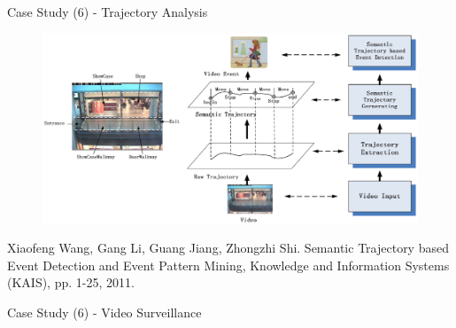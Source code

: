 \documentclass[
 size=14pt,
 paper=smartboard,  %
 mode=present, 		%
 display=slides, 	%
 pauseslide,
 fleqn,leqno]{powerdot}{}
\begin{document}
\begin{slide}{Case Study (6) - Trajectory Analysis}
\begin{figure}[htbp]
  \includegraphics[width=1.0\textwidth]{figures//theme1//dsa_3.eps}
\end{figure}
\footnotesize{Xiaofeng Wang, Gang Li, Guang Jiang, Zhongzhi Shi.
Semantic Trajectory based Event Detection and Event Pattern Mining,
Knowledge and Information Systems (KAIS), pp. 1-25, 2011.}
\end{slide}


\begin{slide}[toc=,bm=]{Case Study (6) - Video Surveillance}
\begin{figure}[ht]
\end{figure}

\end{slide}
\end{document}
